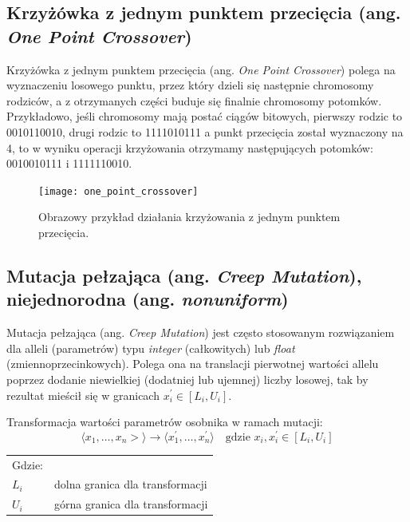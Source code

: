 \documentclass[a4paper,11pt]{article}
\begin{document}
    \subsection{Krzyżówka z jednym punktem przecięcia (ang. \textit{One Point Crossover})}

    Krzyżówka z jednym punktem przecięcia (ang. \textit{One Point Crossover}) polega na wyznaczeniu losowego punktu, przez który dzieli się następnie chromosomy rodziców, a z otrzymanych części buduje się finalnie chromosomy potomków. Przykładowo, jeśli chromosomy mają postać ciągów bitowych, pierwszy rodzic to 0010110010, drugi rodzic to 1111010111 a punkt przecięcia został wyznaczony na 4, to w wyniku operacji krzyżowania otrzymamy następujących potomków: 0010010111 i 1111110010\cite{GeneticAlgorithmEssentials2017}.

    \bigskip

    \begin{figure}[H]
        \label{fig:one_point_crossover}
        \centering
        \texttt{[image: one\_point\_crossover]}
        \caption{Obrazowy przykład działania krzyżowania z jednym punktem przecięcia.}
    \end{figure}

    \subsection{Mutacja pełzająca (ang. \textit{Creep Mutation}), niejednorodna (ang. \textit{nonuniform})}

    Mutacja pełzająca (ang. \textit{Creep Mutation}) jest często stosowanym rozwiązaniem dla alleli (parametrów) typu \textit{integer} (całkowitych) lub \textit{float} (zmiennoprzecinkowych). Polega ona na translacji pierwotnej wartości allelu poprzez dodanie niewielkiej (dodatniej lub ujemnej) liczby losowej, tak by rezultat mieścił się w granicach $x_{i}^{'} \in [L_{i}, U_{i}]$\cite{IntroductionToEvolutionaryComputing2015}.

    \bigskip

    \noindent
    \begin{minipage}[H]{\textwidth}
        \setlength\parindent{17pt} Transformacja wartości parametrów osobnika w ramach mutacji: \\
        \begin{equation}
            \label{eq:mutation_transformation}
            \langle x_{1},\dotsc,x_{n}> \rangle \to \langle x_{1}^{'},\dotsc,x_{n}^{'} \rangle \quad \text{gdzie } x_{i}, x_{i}^{'} \in [L_{i}, U_{i}]
        \end{equation}
        \smallskip
        \begin{tabular}{p{}p{}}
            Gdzie: \\
            $L_{i}$ & dolna granica dla transformacji \\
            $U_{i}$ & górna granica dla transformacji \\
        \end{tabular}
    \end{minipage}
\end{document}
